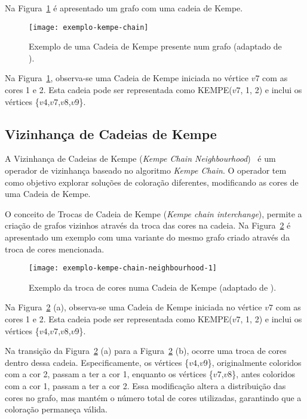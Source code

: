 Na Figura~\ref{fig:exemplo-kempe-chain} é apresentado um grafo com uma cadeia de Kempe.

\begin{figure}[H]
    \centering
    \texttt{[image: exemplo-kempe-chain]}
    \caption{Exemplo de uma Cadeia de Kempe presente num grafo (adaptado de \cite{GuideGraphColouring-Lewis-2016}).}
    \label{fig:exemplo-kempe-chain}
\end{figure}

Na Figura~\ref{fig:exemplo-kempe-chain}, observa-se uma Cadeia de Kempe iniciada no vértice $v7$ com as cores 1 e 2. Esta cadeia pode ser representada como KEMPE($v7$, 1, 2) e inclui os vértices \{$v4$,$v7$,$v8$,$v9$\}.

\subsection{Vizinhança de Cadeias de Kempe}
\label{explic:kempe-chain-neighbourhood}

A Vizinhança de Cadeias de Kempe (\textit{Kempe Chain Neighbourhood})~\cite{GuideGraphColouring-Lewis-2016} é um operador de vizinhança baseado no algoritmo \textit{Kempe Chain}. O operador tem como objetivo explorar soluções de coloração diferentes, modificando as cores de uma Cadeia de Kempe.

O conceito de Trocas de Cadeia de Kempe (\textit{Kempe chain interchange}), permite a criação de grafos vizinhos através da troca das cores na cadeia. Na Figura~\ref{fig:exemplo-kempe-chain-neighbourhood-1} é apresentado um exemplo com uma variante do mesmo grafo criado através da troca de cores mencionada.

\begin{figure}[H]
    \centering
    \texttt{[image: exemplo-kempe-chain-neighbourhood-1]}
    \caption{Exemplo da troca de cores numa Cadeia de Kempe (adaptado de \cite{GuideGraphColouring-Lewis-2016}).}
    \label{fig:exemplo-kempe-chain-neighbourhood-1}
\end{figure}

Na Figura~\ref{fig:exemplo-kempe-chain-neighbourhood-1} (a), observa-se uma Cadeia de Kempe iniciada no vértice $v7$ com as cores 1 e 2. Esta cadeia pode ser representada como KEMPE($v7$, 1, 2) e inclui os vértices \{$v4$,$v7$,$v8$,$v9$\}.

Na transição da Figura~\ref{fig:exemplo-kempe-chain-neighbourhood-1} (a) para a Figura~\ref{fig:exemplo-kempe-chain-neighbourhood-1} (b), ocorre uma troca de cores dentro dessa cadeia. Especificamente, os vértices \{$v4$,$v9$\}, originalmente coloridos com a cor 2, passam a ter a cor 1, enquanto os vértices \{$v7$,$v8$\}, antes coloridos com a cor 1, passam a ter a cor 2. Essa modificação altera a distribuição das cores no grafo, mas mantém o número total de cores utilizadas, garantindo que a coloração permaneça válida.

